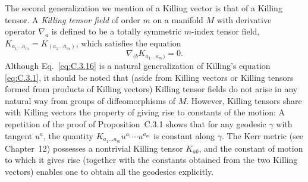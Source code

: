 The second generalization we mention of a Killing vector is that of a Killing tensor.
A \emph{Killing tensor field} of order \(m\) on a manifold \(M\) with derivative
operator \(\nabla_a\) is defined to be a totally symmetric \(m\)-index tensor field,
\(K_{a_1\ldots a_m}=K_{(a_1\ldots a_m)}\), which satisfies the equation
\begin{equation}
  \nabla_{(b}K_{a_1\ldots a_m)}=0.
  \tag{C.3.16}\label{eq:C.3.16}
\end{equation}
Although Eq.~\eqref{eq:C.3.16} is a natural generalization of Killing's equation
\eqref{eq:C.3.1}, it should be noted that (aside from Killing vectors or Killing
tensors formed from products of Killing vectors) Killing tensor fields do not arise in
any natural way from groups of diffeomorphisms of \(M\). However, Killing tensors
share with Killing vectors the property of giving rise to constants of the motion: A
repetition of the proof of Proposition~C.3.1 shows that for any geodesic \(\gamma\)
with tangent \(u^a\), the quantity
\(K_{a_1\ldots a_m}u^{a_1}\cdots u^{a_m}\) is constant along \(\gamma\). The Kerr
metric (see Chapter~12) possesses a nontrivial Killing tensor \(K_{ab}\), and the
constant of motion to which it gives rise (together with the constants obtained from
the two Killing vectors) enables one to obtain all the geodesics explicitly.
